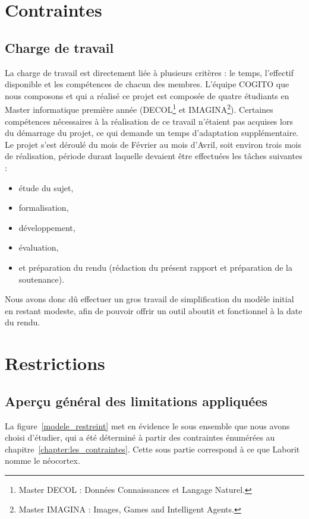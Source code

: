 \section{Contraintes}

\subsection{Charge de travail}
La charge de travail est directement liée à plusieurs critères : le temps,
l'effectif disponible et les compétences de chacun des membres. L'équipe COGITO que nous 
composons et qui a réalisé ce projet est composée de
quatre étudiants en Master informatique première année (DECOL\footnote{Master
DECOL : Données Connaissances et Langage Naturel.} et IMAGINA\footnote{Master
IMAGINA : Images, Games and Intelligent Agents.}). Certaines compétences 
nécessaires à la réalisation de ce travail n'étaient pas
acquises lors du démarrage du projet, ce qui demande un temps d'adaptation
supplémentaire. Le projet s'est déroulé du mois de Février au mois d'Avril, soit environ trois
mois de réalisation, période durant laquelle devaient être effectuées les tâches
suivantes :

\begin{itemize}
\item étude du sujet, 
\item formalisation, 
\item développement, 
\item évaluation,
\item et préparation du rendu (rédaction du présent rapport et préparation de la soutenance).
\end{itemize}

Nous avons donc dû effectuer un gros travail de simplification du modèle initial en restant modeste, afin de pouvoir offrir un outil aboutit et fonctionnel à la date du rendu.

\section{Restrictions}

\subsection{Aperçu général des limitations appliquées}

La figure~\ref{modele_restreint} met en évidence le sous ensemble que nous avons choisi d'étudier, qui a été déterminé à partir des contraintes énumérées au chapitre~\ref{chapter:les_contraintes}. Cette sous partie correspond à ce que Laborit nomme le néocortex.

